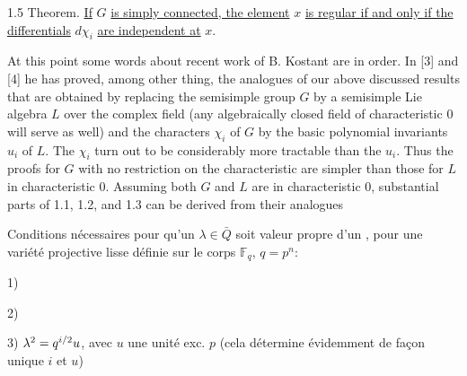 1.5 Theorem. \uline{If} $G$ \uline{is simply connected, the element} $x$ \uline{is regular if and only if the differentials} $d\chi_i$ \uline{are independent at} $x$.

At this point some words about recent work of B. Kostant are in order. In [3] and [4] he has proved, among other thing, the analogues of our above discussed results that are obtained by replacing the semisimple group $G$ by a semisimple Lie algebra $L$ over the complex field (any algebraically closed field of characteristic $0$ will serve as well) and the characters $\chi_i$ of $G$ by the basic polynomial invariants $u_i$ of $L$. The $\chi_i$ turn out to be considerably more tractable than the $u_i$. Thus the proofs for $G$ with no restriction on the characteristic are simpler than those for $L$ in characteristic $0$. Assuming both $G$ and $L$ are in characteristic $0$, substantial parts of 1.1, 1.2, and 1.3 can be derived from their analogues



Conditions nécessaires pour qu'un $\lambda\in\bar Q$ soit valeur propre d'un , pour une variété projective lisse définie sur le corps $\mathbb F_q$, $q=p^n$:


1) 

2) 

3) $\lambda^{{2}}=q^{i/2}u$,  avec $u$ une unité  exc. $p$ (cela détermine évidemment de façon unique $i$ et $u$)





